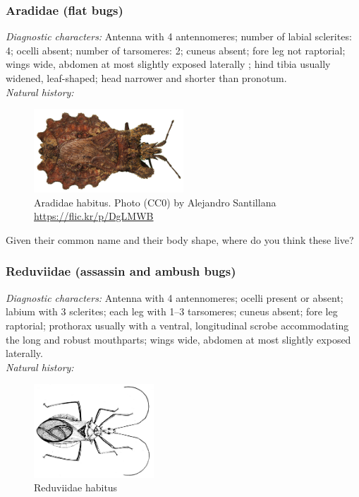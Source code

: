 \documentclass[letterpaper, 11pt]{article}
\begin{document}
\subsubsection{Aradidae (flat bugs)}
\noindent{}\textit{Diagnostic characters:} Antenna with 4 antennomeres; number of labial sclerites: 4; ocelli absent; number of tarsomeres: 2; cuneus absent; fore leg not raptorial; wings wide, abdomen at most slightly exposed laterally ; hind tibia usually widened, leaf-shaped; head narrower and shorter than pronotum.\\

\noindent{}\textit{Natural history:} \\

\begin{figure}[ht!]
 \centering
 \includegraphics[width=0.5\textwidth]{AradidHabitus}
 \caption{Aradidae habitus. Photo (CC0) by Alejandro Santillana \url{https://flic.kr/p/DgLMWB}}
 \label{fig:aradid1}
\end{figure}

\noindent{}Given their common name and their body shape, where do you think these live?\vspace{3cm}

\subsubsection{Reduviidae (assassin and ambush bugs)}
\noindent{}\textit{Diagnostic characters:} Antenna with 4 antennomeres; ocelli present or absent; labium with 3 sclerites; each leg with 1--3 tarsomeres; cuneus absent; fore leg raptorial; prothorax usually with a ventral, longitudinal scrobe accommodating the long and robust mouthparts; wings wide, abdomen at most slightly exposed laterally.\\

\noindent{}\textit{Natural history:} \\

\begin{figure}[ht!]
 \centering
 \includegraphics[width=0.4\textwidth]{ReduviidHabitus}
 \caption{Reduviidae habitus \citep[][Plate XXXII, Fig. 12]{bhl82061}}
 \label{fig:reduviid1}
\end{figure}
\end{document}
